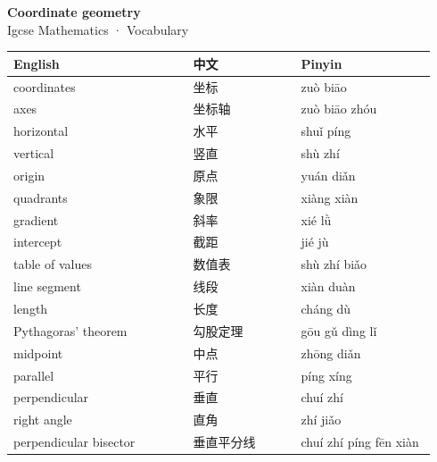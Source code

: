 \documentclass[11pt]{article}
\begin{document}
\begin{center}
  {\LARGE\bfseries Coordinate geometry}\\[0.35em]
  {\large Igcse Mathematics · Vocabulary}
\end{center}
\vspace{0.6em}

\begin{longtable}{@{}p{0.40\linewidth}p{0.24\linewidth}p{0.30\linewidth}@{}}
\toprule
\textbf{English} & \textbf{中文} & \textbf{Pinyin} \\
\midrule
\endhead
\bottomrule
\endlastfoot
coordinates & 坐标 & zuò biāo \\
axes & 坐标轴 & zuò biāo zhóu \\
horizontal & 水平 & shuǐ píng \\
vertical & 竖直 & shù zhí \\
origin & 原点 & yuán diǎn \\
quadrants & 象限 & xiàng xiàn \\
gradient & 斜率 & xié lǜ \\
intercept & 截距 & jié jù \\
table of values & 数值表 & shù zhí biǎo \\
line segment & 线段 & xiàn duàn \\
length & 长度 & cháng dù \\
Pythagoras' theorem & 勾股定理 & gōu gǔ dìng lǐ \\
midpoint & 中点 & zhōng diǎn \\
parallel & 平行 & píng xíng \\
perpendicular & 垂直 & chuí zhí \\
right angle & 直角 & zhí jiǎo \\
perpendicular bisector & 垂直平分线 & chuí zhí píng fēn xiàn \\
\end{longtable}
\end{document}
